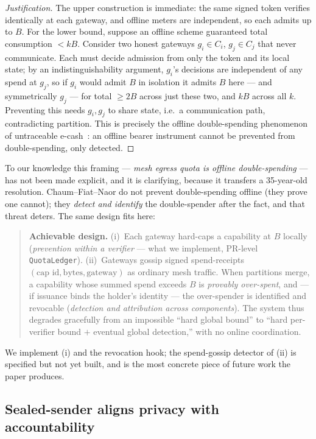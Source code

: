 \documentclass[11pt]{article}
\begin{document}
\begin{proof}[Justification]
The upper construction is immediate: the same signed token verifies identically
at each gateway, and offline meters are independent, so each admits up to $B$.
For the lower bound, suppose an offline scheme guaranteed total consumption
$< kB$. Consider two honest gateways $g_i\in C_i$, $g_j\in C_j$ that never
communicate. Each must decide admission from only the token and its local state;
by an indistinguishability argument, $g_i$'s decisions are independent of any
spend at $g_j$, so if $g_i$ would admit $B$ in isolation it admits $B$ here ---
and symmetrically $g_j$ --- for total $\geq 2B$ across just these two, and $kB$
across all $k$. Preventing this needs $g_i,g_j$ to share state, i.e.\ a
communication path, contradicting partition. This is precisely the offline
double-spending phenomenon of untraceable e-cash~\cite{chaum1990ecash}: an
offline bearer instrument cannot be prevented from double-spending, only
detected.
\end{proof}

To our knowledge this framing --- \emph{mesh egress quota is offline
double-spending} --- has not been made explicit, and it is clarifying, because it
transfers a 35-year-old resolution. Chaum--Fiat--Naor do not prevent
double-spending offline (they prove one cannot); they \emph{detect and identify}
the double-spender after the fact, and that threat deters. The same design fits
here:

\begin{quote}
\textbf{Achievable design.} (i)~Each gateway hard-caps a capability at $B$
locally (\emph{prevention within a verifier} --- what we implement, PR-level
\texttt{QuotaLedger}). (ii)~Gateways gossip signed spend-receipts
$(\text{cap id},\text{bytes},\text{gateway})$ as ordinary mesh traffic. When
partitions merge, a capability whose summed spend exceeds $B$ is
\emph{provably over-spent}, and --- if issuance binds the holder's identity --- the
over-spender is identified and revocable (\emph{detection and attribution across
components}). The system thus degrades gracefully from an impossible ``hard global
bound'' to ``hard per-verifier bound $+$ eventual global detection,'' with no
online coordination.
\end{quote}

We implement (i) and the revocation hook; the spend-gossip detector of (ii) is
specified but not yet built, and is the most concrete piece of future work the
paper produces.

\subsection{Sealed-sender aligns privacy with accountability}\label{sub:privacy}
\end{document}
